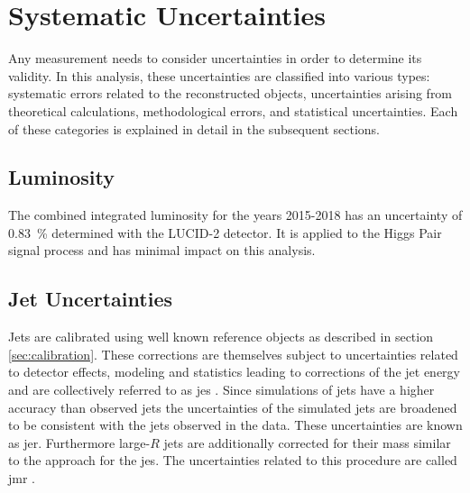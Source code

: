 \chapter{Systematic Uncertainties}\label{ch:systematics}
Any measurement needs to consider uncertainties in order to determine its validity. In this analysis, these uncertainties are classified into various types: systematic errors related to the reconstructed objects, uncertainties arising from theoretical calculations, methodological errors, and statistical uncertainties. Each of these categories is explained in detail in the subsequent sections.

\section{Luminosity}
The combined integrated luminosity for the years 2015-2018 has an uncertainty of \qty[]{0.83}{\percent} determined with the LUCID-2 detector. It is applied to the Higgs Pair signal process and has minimal impact on this analysis.

\section{Jet Uncertainties}
Jets are calibrated using well known reference objects as described in section \ref{sec:calibration}. These corrections are themselves subject to uncertainties related to detector effects, modeling and statistics leading to corrections of the jet energy and are collectively referred to as \ac{jes} \citep{atlas2021jet,Aaboud:2019aa}. Since simulations of jets have a higher accuracy than observed jets the uncertainties of the simulated jets are broadened to be consistent with the jets observed in the data. These uncertainties are known as \ac{jer}. Furthermore large-$R$ jets are additionally corrected for their mass similar to the approach for the \ac{jes}. The uncertainties related to this procedure are called \ac{jmr} \citep{ATLAS-CONF-2020-022}.

